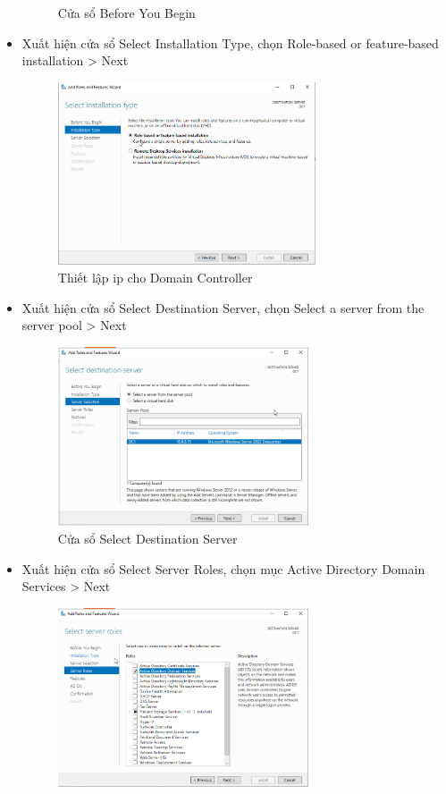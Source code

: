 \documentclass[13pt]{report}
\begin{document}
\begin{itemize}
\begin{figure}[htp]
			\caption{Cửa sổ Before You Begin}
			\label{refhinh1}
		\end{figure}
		\item Xuất hiện cửa sổ Select Installation Type, chọn Role-based or feature-based installation > Next
		\begin{figure}[htp]
			\centering
			\includegraphics[width=0.72\textwidth]{image/Gui/ADDC/3.png}
			\caption{Thiết lập ip cho Domain Controller}
			\label{refhinh1}
		\end{figure}
		\newpage
		\item Xuất hiện cửa sổ Select Destination Server, chọn Select a server from the server pool > Next
		\begin{figure}[htp]
			\centering
			\includegraphics[width=0.7\textwidth]{image/Gui/ADDC/4.png}
			\caption{Cửa sổ Select Destination Server}
		\end{figure}
		\item Xuất hiện cửa sổ Select Server Roles, chọn mục Active Directory Domain Services > Next
		\begin{figure}[htp]
			\centering
			\includegraphics[width=0.7\textwidth]{image/Gui/ADDC/5.png}

\end{figure}
\end{itemize}
\end{document}
